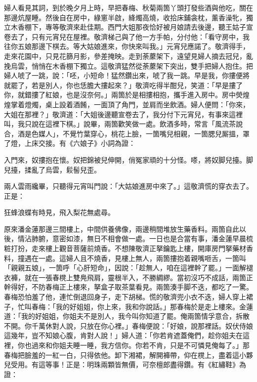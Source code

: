 婦人看見其詞，到於晚夕月上時，早把春梅、秋菊兩箇丫頭打發些酒與他吃，關在那邊炕屋睡。然後自在房中，綠窻半啟，絳燭高燒，收拾床鋪衾枕，薰香澡牝，獨立木香棚下，專等敬濟來赴佳期。西門大姐那夜恰好被月娘請去後邊，聽王姑子宣卷去了，只有元宵兒在屋裡。敬濟梯己與了他一方手帕，分付他：「看守房中，我往你五娘那邊下棋去。等大姑娘進來，你快來叫我。」元宵兒應諾了。敬濟得手，走來花園中，只見花篩月影，參差掩映。走到荼䕷架下，遠望見婦人摘去冠兒，亂挽烏雲，悄悄在木香棚下獨立。這敬濟猛然從荼䕷架下突出，雙手把婦人抱住。把婦人唬了一跳，說：「呸，小短命！猛然鑽出來，唬了我一跳。早是我，你摟便將就罷了，若是別人，你也恁膽大摟起來？」敬濟吃得半酣兒，笑道：「早是摟了你，就錯摟了紅娘，也是沒奈何。」{}兩箇於是相摟相抱，攜手進入房中。房中熒煌煌掌着燈燭，桌上設着酒餚，一面頂了角門，並肩而坐飲酒。婦人便問：「你來，大姐在那裡？」敬濟道：「大姐後邊聽宣卷去了，我分付下元宵兒，有事來這裡叫，我只說在這裡下棋。」說畢，兩箇歡笑做一處。飲酒多時，常言「風流茶說合，酒是色媒人」，不覺竹葉穿心，桃花上臉，一箇嘴兒相親，一箇腮兒厮搵，罩了燈，上床交接。有《六娘子》小詞為證：

\begin{myquote}
入門來，奴摟抱在懷。奴把錦被兒伸開，俏冤家頑的十分怪。嗏，將奴脚兒擡。脚兒擡，揉亂了烏雲，鬏髻兒歪。
\end{myquote}

兩人雲雨纔畢，只聽得元宵叫門說：「大姑娘進房中來了。」這敬濟慌的穿衣去了。正是：

\begin{myquote}
狂蜂浪蝶有時見，飛入梨花無處尋。
\end{myquote}

原來潘金蓮那邊三間樓上，中間供養佛像，兩邊稍間堆放生藥香料。兩箇自此以後，情沾肺腑，意密如漆，無日不相會做一處。一日也是合當有事，潘金蓮早晨梳粧打扮，走來樓上觀音菩薩前燒香。不想陳敬濟正拏鑰匙上樓，開庫房門拏藥材香料，撞遇在一處。這婦人且不燒香，{}見樓上無人，兩箇摟抱着親嘴咂舌，一箇叫「親親五娘」，一箇呼「心肝短命」，{}因說：「趁無人，咱在這裡幹了罷。」一面解褪衣褲，就在一張春櫈上雙鳧飛肩，靈根半入，不勝綢繆。當初沒巧不成話，兩箇正幹得好，不防春梅正上樓來，拏盒子取茶葉看見。兩箇湊手脚不迭，都吃了一驚。春梅恐怕羞了他，連忙倒退回身子，走下胡梯。慌的敬濟兜小衣不迭，婦人穿上裙子，忙叫春梅：「我的好姐姐，你上來，我和你說話。」那春梅於是走上樓來。金蓮道：「我的好姐姐，你姐夫不是別人，我今叫你知道了罷。俺兩箇情孚意合，拆散不開。你千萬休對人說，只放在你心裡。」春梅便說：「好娘，說那裡話。奴伏侍娘這幾年，豈不知娘心腹，肯對人說！」婦人道：「你若肯遮蓋俺們，趁你姐夫在這裡，你也過來和你姐夫睡一睡，我方信你。你若不肯，只是不可憐見俺每了。」那春梅把臉羞的一紅一白，只得依他。卸下湘裙，解開褲帶，仰在櫈上，盡着這小夥兒受用。{}有這等事！正是：明珠兩顆皆無價，可奈檀郎盡得鑽。有《紅繡鞋》為證：

